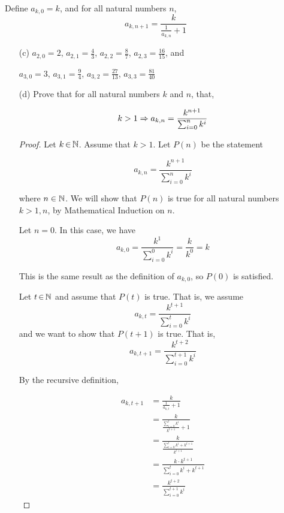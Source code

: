 \documentclass[12pt, a4paper]{amsart}
\theoremstyle{definition}
\theoremstyle{remark}
\numberwithin{Theorem}{section}
\begin{document}
\newpage

Define $a_{k, 0} = k$, and for all natural numbers $n$, 
$$a_{k, n + 1} = \frac{k}{\frac{1}{a_{k, n}} + 1}$$

\begin{enumerate}

    \item [(c)] $a_{2, 0} = 2$, $a_{2, 1} = \frac{4}{3}$, $a_{2, 2} = \frac{8}{7}$, 
     $a_{2, 3} = \frac{16}{15}$, and
     
     $a_{3, 0} = 3$, $a_{3, 1} = \frac{9}{4}$, $a_{3, 2} = \frac{27}{13}$, 
     $a_{3, 3} = \frac{81}{40}$
    
    \item[(d)] Prove that for all natural numbers $k$ and $n$, that,
    
    $$k > 1 \Rightarrow a_{k, n} = \frac{k^{n+1}}{\sum_{i = 0}^{n} k^i}$$
    
    \begin{proof}
    Let $k \,{\in}\, \mathbb N$. Assume that $k > 1$.
    Let $P(n)$ be the statement
    
    $$a_{k, n} = \frac{k^{n+1}}{\sum_{i = 0}^{n} k^i}$$ 
    
    where $n \in \mathbb N$. We will show that $P(n)$ is true for all natural numbers $k > 1, n$,
    by Mathematical Induction on $n$.
    
    \base
    
    Let $n = 0$. In this case, we have
    $$a_{k, 0} = \frac{k^{1}}{\sum_{i = 0}^{0} k^i} = \frac{k}{k^{0}} = k$$
    
    This is the same result as the definition of $a_{k, 0}$, so $P(0)$ is satisfied.

    \istep
    
    Let $t \,{\in}\, \mathbb N$ and assume that $P(t)$ is true. That is, we assume
    $$a_{k, t} = \frac{k^{t+1}}{{\sum_{i = 0}^{t} k^i}}$$
    and we want to show that $P(t + 1)$ is true. That is,
    $$a_{k, t+1} = \frac{k^{t+2}}{{\sum_{i = 0}^{t+1} k^i}}$$
    
    By the recursive definition,
    
    \begin{align*}
        a_{k, t+1} &= \frac{k}{\frac{1}{a_{k, t}} + 1} \\
        &= \frac{k}{\frac{\sum_{i = 0}^{t} k^i}{k^{t+1}} + 1} \tag{By induction hypothesis} \\
        &= \frac{k}{\frac{\sum_{i = 0}^{t} k^i + k^{t+1}}{k^{t+1}}} \\
        &= \frac{k \cdot k^{t+1}}{{\sum_{i = 0}^{t} k^i + k^{t+1}}} \\
        &= \frac{k^{t+2}}{{\sum_{i = 0}^{t+1} k^i}} 
    \end{align*}
    

\end{proof}
\end{enumerate}
\end{document}
